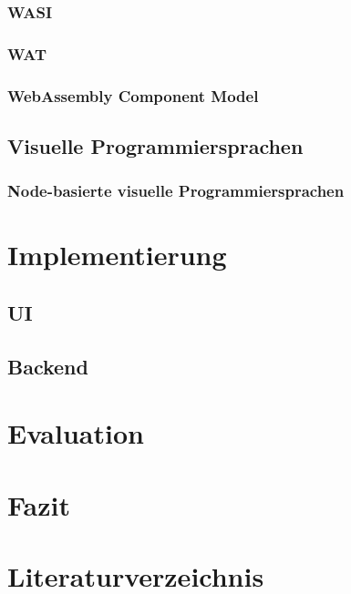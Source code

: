 \documentclass[ngerman]{article}
\begin{document}
\subsubsection{WASI}
\subsubsection{WAT}
\subsubsection{WebAssembly Component Model}
\subsection{Visuelle Programmiersprachen}
\subsubsection{Node-basierte visuelle Programmiersprachen}

\section{Implementierung}
\subsection{UI}
\subsection{Backend}

\section{Evaluation}
\section{Fazit}
\section{Literaturverzeichnis}


\printbibliography
\end{document}

